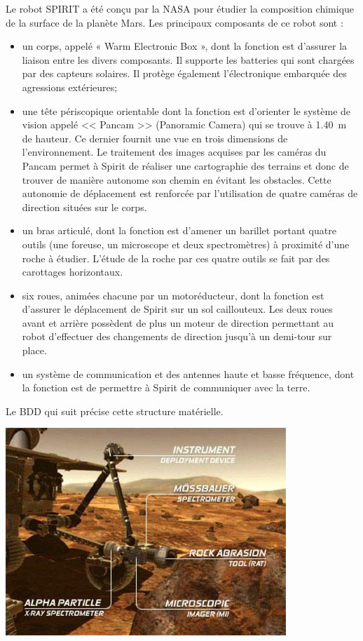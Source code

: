 \documentclass[10pt,fleqn]{article} %
\begin{document}
\begin{multicols}{2}
\begin{multicols}{2}
Le robot SPIRIT a été conçu par la NASA pour étudier la composition chimique de la surface de la planète Mars. Les principaux composants de ce robot sont :
\begin{itemize}
\item un corps, appelé « Warm Electronic Box », dont la fonction est d’assurer la liaison entre les divers composants. Il supporte les batteries qui sont chargées par des capteurs solaires. Il protège également l'électronique embarquée des agressions extérieures;
\item une tête périscopique orientable dont la fonction est d’orienter le système de vision appelé << Pancam >> (Panoramic Camera) qui se trouve à \SI{1,40}{m} de hauteur. Ce dernier fournit une vue en trois dimensions de l’environnement. Le traitement des images acquises par les caméras du Pancam permet à Spirit de réaliser une cartographie des terrains et donc de trouver de manière autonome son chemin en évitant les obstacles. Cette autonomie de déplacement est renforcée par l’utilisation de quatre caméras de direction situées sur le corps.
\item un bras articulé, dont la fonction est d’amener un barillet portant quatre outils (une foreuse, un microscope et deux spectromètres) à proximité d’une roche à étudier. L’étude de la roche
par ces quatre outils se fait par des carottages horizontaux.
\item six roues, animées chacune par un motoréducteur, dont la fonction est d’assurer le déplacement de Spirit sur un sol caillouteux. Les deux roues avant et arrière possèdent de
plus un moteur de direction permettant au robot d’effectuer des changements de direction jusqu’à un demi-tour sur place.
\item un système de communication et des antennes haute et basse fréquence, dont la fonction est de permettre à Spirit de communiquer avec la terre.
\end{itemize}
Le BDD qui suit précise cette structure matérielle.


\begin{center}
\includegraphics[width=\linewidth]{images/fig_03.png}
\end{center}



\end{multicols}
\end{multicols}
\end{document}
